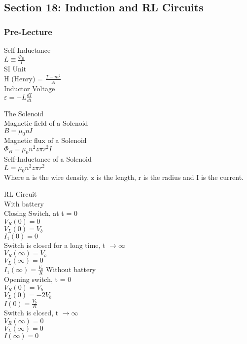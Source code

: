 \documentclass{article}
\begin{document}
\subsection{Section 18: Induction and RL Circuits}
\subsubsection{Pre-Lecture}
\noindent
Self-Inductance \\
$L \equiv \frac{\Phi_B}{I}$ \\
SI Unit \\
H (Henry) = $\frac{T-m^2}{A}$ \\
Inductor Voltage \\
$\varepsilon = -L \frac{dI}{dt}$ 

\vspace{2mm}

\noindent
The Solenoid \\
Magnetic field of a Solenoid \\
$B = \mu_0 n I$ \\
Magnetic flux of a Solenoid \\
$\Phi_B = \mu_0 n^2 z \pi r^2 I$\\
Self-Inductance of a Solenoid \\
$L = \mu_0 n^2 z \pi r^2 $ \\
Where n is the wire density, z is the length, r is the radius and I is the current.

\vspace{2mm}

\noindent
RL Circuit \\
With battery \\
Closing Switch, at t = 0 \\
$V_R(0) = 0$ \\
$V_L(0) = V_b$ \\
$I_1(0) = 0 $ \\
Switch is closed for a long time, t $\to \infty$ \\
$V_R (\infty) = V_b $ \\
$V_L (\infty) = 0 $ \\
$I_1 (\infty) = \frac{V_b}{R} $
Without battery \\
Opening switch, t = 0 \\
$V_R(0) = V_b $ \\
$V_L(0) = -2V_b$ \\
$I(0) = \frac{V_b}{R}$ \\
Switch is closed, t $\to \infty$ \\
$V_R (\infty) = 0$ \\
$V_L (\infty) = 0$ \\
$I(\infty) = 0 $
\end{document}
